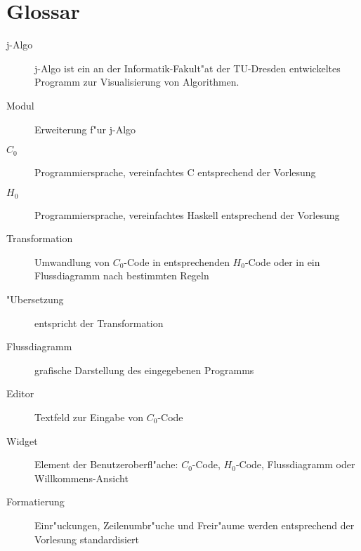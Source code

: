 \section{Glossar}


\begin{description}
  \item[j-Algo]
    j-Algo ist ein an der Informatik-Fakult"at der TU-Dresden entwickeltes Programm zur Visualisierung von Algorithmen.
  \item[Modul]
    Erweiterung f"ur j-Algo
  \item[$C_0$]
    Programmiersprache, vereinfachtes C entsprechend der Vorlesung
  \item[$H_0$]
    Programmiersprache, vereinfachtes Haskell entsprechend der Vorlesung
  \item[Transformation]
    Umwandlung von $C_0$-Code in entsprechenden $H_0$-Code oder in ein Flussdiagramm nach bestimmten Regeln
  \item["Ubersetzung]
    entspricht der Transformation
  \item[Flussdiagramm]
    grafische Darstellung des eingegebenen Programms
  \item[Editor]
    Textfeld zur Eingabe von $C_0$-Code
  \item[Widget]
    Element der Benutzeroberfl"ache: $C_0$-Code, $H_0$-Code, Flussdiagramm oder Willkommens-Ansicht 
  \item[Formatierung]
    Einr"uckungen, Zeilenumbr"uche und Freir"aume werden entsprechend der Vorlesung standardisiert
\end{description}